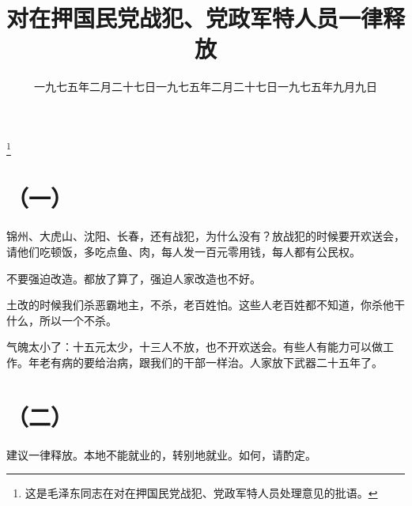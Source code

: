 
\title{对在押国民党战犯、党政军特人员一律释放}
\date{一九七五年二月二十七日}
\thanks{这是毛泽东同志在对在押国民党战犯、党政军特人员处理意见的批语。}
\maketitle


\date{一九七五年二月二十七日}
\section*{（一）}

锦州、大虎山、沈阳、长春，还有战犯，为什么没有？放战犯的时候要开欢送会，请他们吃顿饭，多吃点鱼、肉，每人发一百元零用钱，每人都有公民权。

不要强迫改造。都放了算了，强迫人家改造也不好。

土改的时候我们杀恶霸地主，不杀，老百姓怕。这些人老百姓都不知道，你杀他干什么，所以一个不杀。

气魄太小了：十五元太少，十三人不放，也不开欢送会。有些人有能力可以做工作。年老有病的要给治病，跟我们的干部一样治。人家放下武器二十五年了。

\date{一九七五年九月九日}
\section*{（二）}

建议一律释放。本地不能就业的，转别地就业。如何，请酌定。

